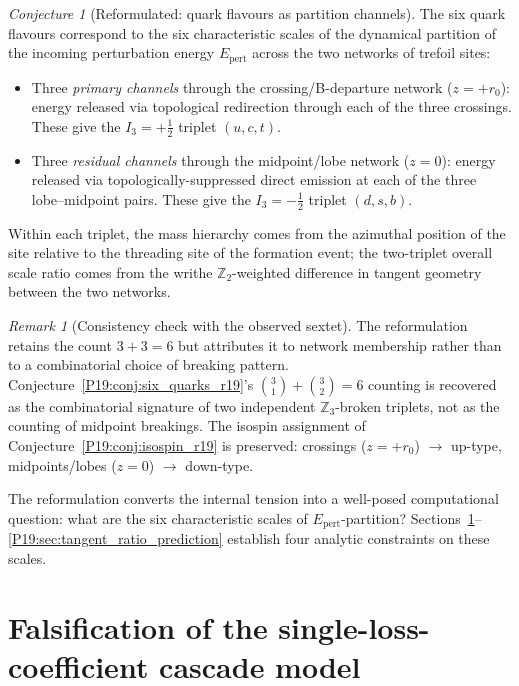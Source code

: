 \documentclass[11pt,a4paper]{article}
\theoremstyle{definition}\newtheorem{definition}[theorem]{Definition}
\theoremstyle{remark}
\newtheorem{remark}[theorem]{Remark}
\newtheorem{conjecture}[theorem]{Conjecture}
\newcommand{\Ztwo}{\mathbb{Z}_2}
\newcommand{\Zthree}{\mathbb{Z}_3}
\begin{document}
\begin{conjecture}[Reformulated: quark flavours as partition channels]
\label{P19:conj:six_quarks_reformulated}
The six quark flavours correspond to the six characteristic
scales of the dynamical partition of the incoming perturbation
energy $E_{\mathrm{pert}}$ across the two networks of trefoil
sites:
\begin{itemize}[noitemsep]
\item Three \emph{primary channels} through the crossing/B-departure
  network ($z=+r_0$): energy released via topological redirection
  through each of the three crossings.  These give the $I_3=+\tfrac12$
  triplet $(u,c,t)$.
\item Three \emph{residual channels} through the midpoint/lobe
  network ($z=0$): energy released via topologically-suppressed
  direct emission at each of the three lobe--midpoint pairs.
  These give the $I_3=-\tfrac12$ triplet $(d,s,b)$.
\end{itemize}
Within each triplet, the mass hierarchy comes from the azimuthal
position of the site relative to the threading site of the
formation event; the two-triplet overall scale ratio comes from
the writhe $\Ztwo$-weighted difference in tangent geometry between
the two networks.
\end{conjecture}

\begin{remark}[Consistency check with the observed sextet]
\label{P19:rem:sextet_check}
The reformulation retains the count $3+3=6$ but attributes it to
network membership rather than to a combinatorial choice of
breaking pattern.  Conjecture~\ref{P19:conj:six_quarks_r19}'s
$\binom{3}{1}+\binom{3}{2}=6$ counting is recovered as the
combinatorial signature of two independent $\Zthree$-broken
triplets, not as the counting of midpoint breakings.  The
isospin assignment of Conjecture~\ref{P19:conj:isospin_r19} is
preserved: crossings ($z=+r_0$) $\to$ up-type,
midpoints/lobes ($z=0$) $\to$ down-type.
\end{remark}

The reformulation converts the internal tension into a well-posed
computational question: what are the six characteristic scales of
$E_{\mathrm{pert}}$-partition?
Sections~\ref{P19:sec:cascade_falsification}--\ref{P19:sec:tangent_ratio_prediction}
establish four analytic constraints on these scales.

\section{Falsification of the single-loss-coefficient cascade model}
\label{P19:sec:cascade_falsification}
\end{document}
